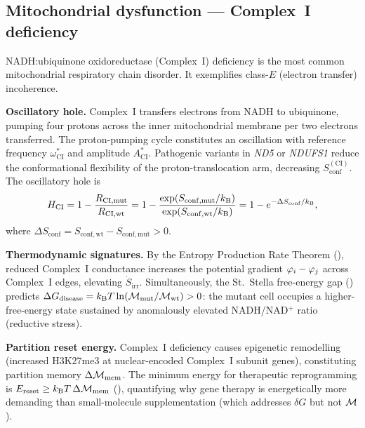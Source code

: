 \subsection{Mitochondrial dysfunction — Complex~I deficiency}
\label{sec:ch07-eg-mito}

\begin{example}
\label{ex:ch07-complex-i}
NADH:ubiquinone oxidoreductase (Complex~I) deficiency is the most common
mitochondrial respiratory chain disorder.  It exemplifies class-$E$ (electron
transfer) incoherence.

\textbf{Oscillatory hole.}  Complex~I transfers electrons from NADH to
ubiquinone, pumping four protons across the inner mitochondrial membrane
per two electrons transferred.  The proton-pumping cycle constitutes an
oscillation with reference frequency $\omega_{\mathrm{CI}}^{*}$ and amplitude
$A_{\mathrm{CI}}^{*}$.  Pathogenic variants in \emph{ND5} or \emph{NDUFS1}
reduce the conformational flexibility of the proton-translocation arm,
decreasing $S_{\mathrm{conf}}^{(\mathrm{CI})}$.  The oscillatory hole is
\begin{equation}
  H_{\mathrm{CI}}
  = 1 - \frac{R_{\mathrm{CI,mut}}}{R_{\mathrm{CI,wt}}}
  = 1 - \frac{\exp(S_{\mathrm{conf,mut}}/k_{\mathrm{B}})}{\exp(S_{\mathrm{conf,wt}}/k_{\mathrm{B}})}
  = 1 - e^{-\Delta S_{\mathrm{conf}}/k_{\mathrm{B}}},
  \label{eq:ch07-CI-hole}
\end{equation}
where $\Delta S_{\mathrm{conf}} = S_{\mathrm{conf,wt}} - S_{\mathrm{conf,mut}} > 0$.

\textbf{Thermodynamic signatures.}  By the Entropy Production Rate Theorem
(), reduced Complex~I conductance increases the
potential gradient $\varphi_i - \varphi_j$ across Complex~I
edges, elevating $\dot{S}_{\mathrm{irr}}$.  Simultaneously, the St.\ Stella
free-energy gap () predicts
$\Delta G_{\mathrm{disease}} = k_{\mathrm{B}} T\ln(\mathcal{M}_{\mathrm{mut}}/\mathcal{M}_{\mathrm{wt}}) > 0$:
the mutant cell occupies a higher-free-energy state sustained by anomalously
elevated NADH/NAD$^+$ ratio (reductive stress).

\textbf{Partition reset energy.}  Complex~I deficiency causes epigenetic
remodelling (increased H3K27me3 at nuclear-encoded Complex~I subunit genes),
constituting partition memory $\Delta\mathcal{M}_{\mathrm{mem}}$.  The minimum
energy for therapeutic reprogramming is
$E_{\mathrm{reset}} \geq k_{\mathrm{B}} T\,\Delta\mathcal{M}_{\mathrm{mem}}$
(), quantifying why gene therapy is energetically
more demanding than small-molecule supplementation (which addresses
$\delta G$ but not $\mathcal{M}$).
\end{example}

